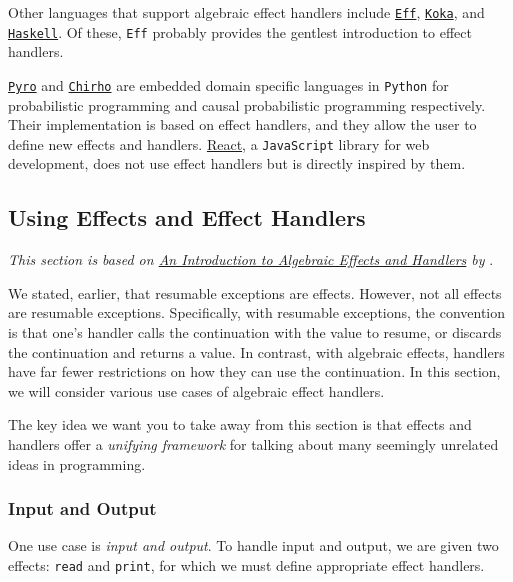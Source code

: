 Other languages that support algebraic effect handlers include \href{https://www.eff-lang.org/}{\texttt{Eff}}, \href{https://koka-lang.github.io/koka/doc/index.html}{\texttt{Koka}}, and \href{https://www.haskell.org/}{\texttt{Haskell}}. Of these, \texttt{Eff} probably provides the gentlest introduction to effect handlers.

\href{https://pyro.ai/}{\texttt{Pyro}} and \href{https://basisresearch.github.io/chirho/getting_started.html}{\texttt{Chirho}} are embedded domain specific languages in \texttt{Python} for probabilistic programming and causal probabilistic programming respectively. Their implementation is based on effect handlers, and they allow the user to define new effects and handlers. \href{https://react.dev/}{React}, a \texttt{JavaScript} library for web development, does not use effect handlers but is directly inspired by them.

\subsection{Using Effects and Effect Handlers}
\textit{This section is based on \href{https://www.eff-lang.org/handlers-tutorial.pdf}{An Introduction to Algebraic Effects and Handlers} by} \citet{pretnar-2015}.

We stated, earlier, that resumable exceptions are effects. However, not all effects are resumable exceptions. Specifically, with resumable exceptions, the convention is that one's handler calls the continuation with the value to resume, or discards the continuation and returns a value. In contrast, with algebraic effects, handlers have far fewer restrictions on how they can use the continuation. In this section, we will consider various use cases of algebraic effect handlers. 

The key idea we want you to take away from this section is that effects and handlers offer a \textit{unifying framework} for talking about many seemingly unrelated ideas in programming. 

\subsubsection{Input and Output}
One use case is \textit{input and output}. To handle input and output, we are given two effects: \texttt{read} and \texttt{print}, for which we must define appropriate effect handlers. 

